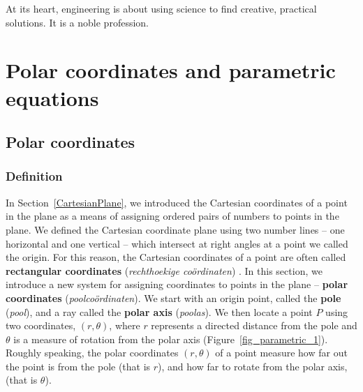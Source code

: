\begin{savequote}[75mm]
At its heart, engineering is about using science to find creative, practical solutions. It is a noble profession.
\end{savequote}

\chapter{Polar coordinates and parametric equations}
\label{chap_parametric}
\graphicspath{{figures/Parametric/}}


\section{Polar coordinates}
\label{sec_polar}
\subsection{Definition}
In Section~\ref{CartesianPlane}, we introduced the Cartesian coordinates of a point in the plane as a means of assigning ordered pairs of numbers to points in the plane.  We defined the Cartesian coordinate plane using two number lines -- one horizontal and one vertical -- which intersect at right angles at a point we called the origin. For this reason, the Cartesian coordinates of a point are often called \textbf{rectangular coordinates} (\textit{rechthoekige co\"ordinaten}) . In this section, we introduce a new system for assigning coordinates to points in the plane --  \textbf{polar coordinates} (\textit{poolco\"ordinaten}).  We start with an origin point, called the \textbf{pole} (\textit{pool}), and a ray called the \textbf{polar axis} (\textit{poolas}). We then locate a point $P$ using two coordinates, $(r,\theta)$, where $r$ represents a directed distance from the pole and $\theta$ is a measure of rotation from the polar axis (Figure~\ref{fig_parametric_1}).  Roughly speaking,  the polar coordinates $(r,\theta)$ of a point measure how far out the point is from the pole (that is $r$), and how far to rotate from the polar axis, (that is $\theta$).


